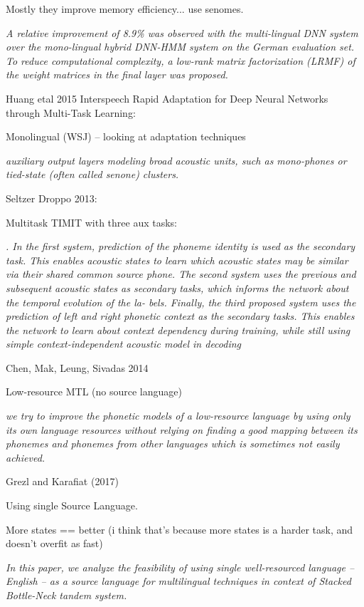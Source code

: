\documentclass[a4paper]{article}
\begin{document}
Mostly they improve memory efficiency... use senomes.

\textit{  A relative improvement of 8.9\% was
observed with the multi-lingual DNN system over the mono-lingual
hybrid DNN-HMM system on the German evaluation set. To reduce
computational complexity, a low-rank matrix factorization (LRMF)
of the weight matrices in the final layer was proposed.}





Huang etal 2015 Interspeech Rapid Adaptation for Deep Neural Networks through Multi-Task Learning:

Monolingual (WSJ) -- looking at adaptation techniques

\textit{auxiliary output layers modeling
broad acoustic units, such as mono-phones or tied-state (often
called senone) clusters.}




Seltzer Droppo 2013:

Multitask TIMIT with three aux tasks:

\textit{. In the first system,
prediction of the phoneme identity is used as the secondary task.
This enables acoustic states to learn which acoustic states may be
similar via their shared common source phone. The second system
uses the previous and subsequent acoustic states as secondary tasks,
which informs the network about the temporal evolution of the la-
bels. Finally, the third proposed system uses the prediction of left
and right phonetic context as the secondary tasks. This enables the
network to learn about context dependency during training, while
still using simple context-independent acoustic model in decoding}




Chen, Mak, Leung, Sivadas 2014

Low-resource MTL (no source language)

\textit{we try to improve the phonetic models of a low-resource language by using only its own language resources without relying on finding a good mapping between its phonemes and phonemes from other languages which is sometimes not easily achieved.}


Grezl and Karafiat (2017)

Using single Source Language.

More states == better (i think that's because more states is a harder task, and doesn't overfit as fast)

\textit{In this paper, we analyze the feasibility of using single well-resourced language – English – as a source language for multilingual techniques in context of Stacked Bottle-Neck tandem system.}
\end{document}
